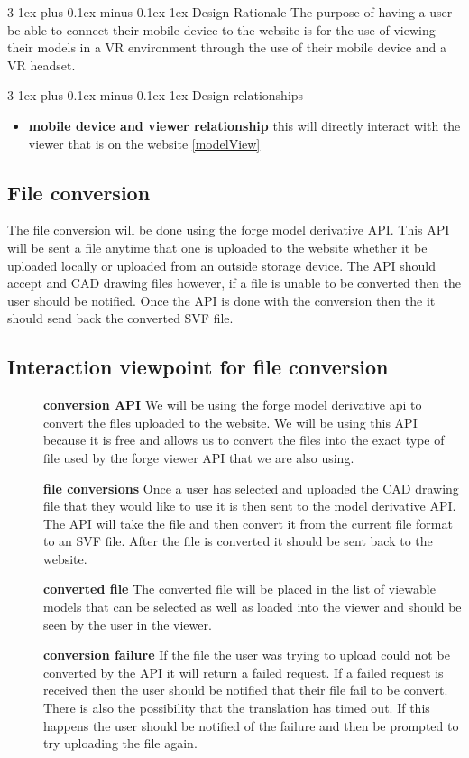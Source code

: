 \documentclass[letterpaper, 10pt, draftclsnofoot, compsoc, onecolumn]{IEEEtran}
\makeatletter
\def\subsubsection{\@startsection{subsubsection}%
                                 {3}%
                                 {\z@}%
                                 {1ex plus 0.1ex minus 0.1ex}%
                                 {1ex}%
                                 {\normalfont\normalsize}}%
\makeatother
\begin{document}
\subsubsection{Design Rationale}
	The purpose of having a user be able to connect their mobile device to the website is for the use of viewing their models in a VR environment through the use of their mobile device and a VR headset. 

\subsubsection{Design relationships}
\begin{itemize}
	\item[]\textbf{mobile device and viewer relationship} this will directly interact with the viewer that is on the website \ref{modelView}
\end{itemize}
\subsection{File conversion}
\label{model derivative} 
	The file conversion will be done using the forge model derivative API. This API will be sent a file anytime that one is uploaded to the website whether it be uploaded locally or uploaded from an outside storage device. The API should accept and CAD drawing files however, if a file is unable to be converted then the user should be notified. Once the API is done with the conversion then the it should send back the converted SVF file. 

\subsection{Interaction viewpoint for file conversion}
\begin{description}
	\item[]\textbf{conversion API} We will be using the forge model derivative api to convert the files uploaded to the website. We will be using this API because it is free and allows us to convert the files into the exact type of file used by the forge viewer API that we are also using. 
	\item[]\textbf{file conversions} Once a user has selected and uploaded the CAD drawing file that they would like to use it is then sent to the model derivative API. The API will take the file and then convert it from the current file format to an SVF file. After the file is converted it should be sent back to the website.
	\item[]\textbf{converted file} The converted file will be placed in the list of viewable models that can be selected as well as loaded into the viewer and should be seen by the user in the viewer.
	\item[]\textbf{conversion failure} If the file the user was trying to upload could not be converted by the API it will return a failed request. If a failed request is received then the user should be notified that their file fail to be convert. There is also the possibility that the translation has timed out. If this happens the user should be notified of the failure and then be prompted to try uploading the file again.
\end{description}
\end{document}
